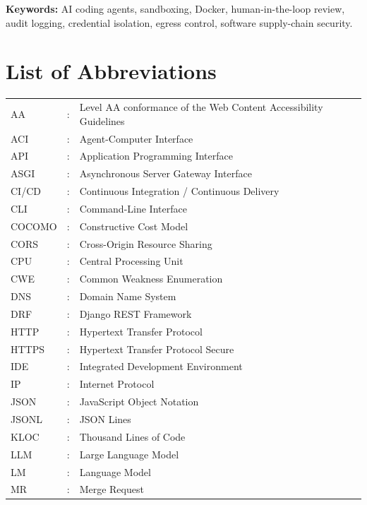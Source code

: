 \documentclass[12pt,a4paper,oneside]{report}
\begin{document}
\vspace{0.15in}
\noindent\textbf{Keywords:} AI coding agents, sandboxing, Docker, human-in-the-loop review, audit logging, credential isolation, egress control, software supply-chain security.
\clearpage

{\small\tableofcontents}
\clearpage
\listoffigures
\clearpage
\listoftables
\clearpage

\chapter*{List of Abbreviations}\label{list-of-abbreviations}
\begin{longtable}{@{}p{1.1in}@{}p{0.25in}@{}p{4.9in}@{}}
AA &: & Level AA conformance of the Web Content Accessibility Guidelines \\[2pt]
ACI &: & Agent-Computer Interface \\[2pt]
API &: & Application Programming Interface \\[2pt]
ASGI &: & Asynchronous Server Gateway Interface \\[2pt]
CI/CD &: & Continuous Integration / Continuous Delivery \\[2pt]
CLI &: & Command-Line Interface \\[2pt]
COCOMO &: & Constructive Cost Model \\[2pt]
CORS &: & Cross-Origin Resource Sharing \\[2pt]
CPU &: & Central Processing Unit \\[2pt]
CWE &: & Common Weakness Enumeration \\[2pt]
DNS &: & Domain Name System \\[2pt]
DRF &: & Django REST Framework \\[2pt]
HTTP &: & Hypertext Transfer Protocol \\[2pt]
HTTPS &: & Hypertext Transfer Protocol Secure \\[2pt]
IDE &: & Integrated Development Environment \\[2pt]
IP &: & Internet Protocol \\[2pt]
JSON &: & JavaScript Object Notation \\[2pt]
JSONL &: & JSON Lines \\[2pt]
KLOC &: & Thousand Lines of Code \\[2pt]
LLM &: & Large Language Model \\[2pt]
LM &: & Language Model \\[2pt]
MR &: & Merge Request \\[2pt]

\end{longtable}
\end{document}
